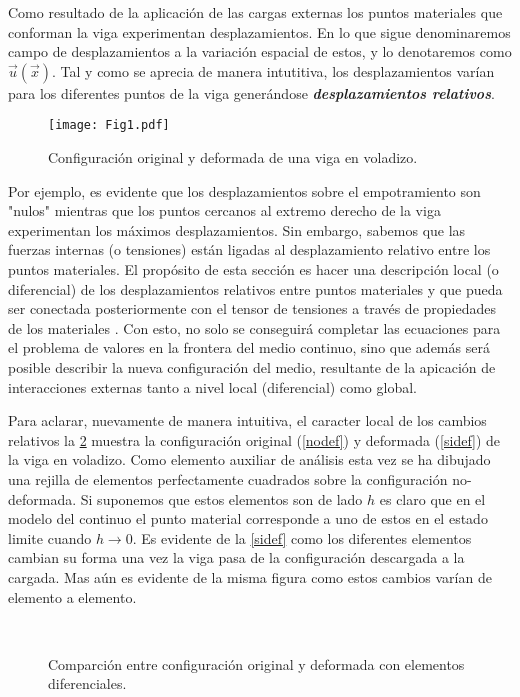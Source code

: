\documentclass[../notas medios.tex]{subfiles}
\begin{document}
Como resultado de la aplicación de las cargas externas los puntos materiales que conforman la viga experimentan desplazamientos. En lo que sigue denominaremos campo de desplazamientos a la variación espacial de estos, y lo denotaremos como $\vec u(\vec x)$. Tal y como se aprecia de manera intutitiva, los desplazamientos varían para los diferentes puntos de la viga generándose \textbf{\textit{desplazamientos relativos}}.

\begin{figure}[H]
\centering
	\texttt{[image: Fig1.pdf]}
	\caption{Configuración original y deformada de una viga en voladizo.}
	\label{viga1}
\end{figure}


Por ejemplo, es evidente que los desplazamientos sobre el empotramiento son "nulos" mientras que los puntos cercanos al extremo derecho de la viga experimentan los máximos desplazamientos. Sin embargo, sabemos que las fuerzas internas (o tensiones) están ligadas al desplazamiento relativo entre los puntos materiales. El propósito de esta sección es hacer una descripción local (o diferencial) de los desplazamientos relativos entre puntos materiales y que pueda ser conectada posteriormente con el tensor de tensiones a través de propiedades de los materiales . Con esto, no solo se conseguirá completar las ecuaciones para el problema de valores en la frontera del medio continuo, sino que además será posible describir la nueva configuración del medio, resultante de la apicación de interacciones externas tanto a nivel local (diferencial) como global.

Para aclarar, nuevamente de manera intuitiva, el caracter local de los cambios relativos la \cref{steady_state} muestra la configuración original (\cref{nodef}) y deformada (\cref{sidef}) de la viga en voladizo. Como elemento auxiliar de análisis esta vez se ha dibujado una rejilla de elementos perfectamente cuadrados sobre la configuración no-deformada.   Si suponemos que estos elementos son de lado $h$ es claro que en el modelo del continuo el punto material corresponde a uno de estos en el estado limite cuando $h \to 0.$ Es evidente de la \cref{sidef} como los diferentes elementos cambian su forma una vez la viga pasa de la configuración descargada a la cargada. Mas aún es evidente de la misma figura como estos cambios varían de elemento a elemento.

\begin{figure}[H]
     \centering
     \hspace{0.5cm}\\
     \caption{Comparción entre configuración original y deformada con elementos diferenciales.}
     \label{steady_state}
\end{figure}
\end{document}
